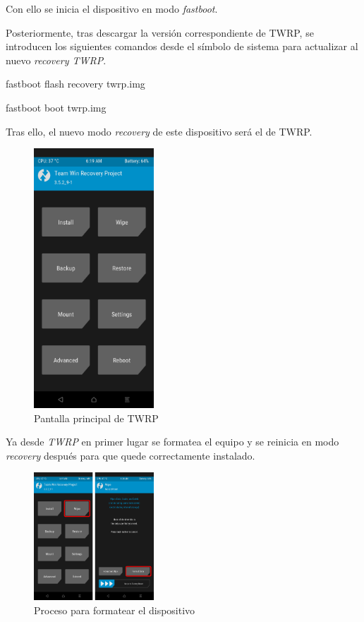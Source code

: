 \documentclass[12pt,a4paper,onecolumn,oneside]{report}
\begin{document}
Con ello se inicia el dispositivo en modo \textit{fastboot}.

Posteriormente, tras descargar la versión correspondiente de TWRP, se introducen los siguientes comandos desde el símbolo de sistema para actualizar al nuevo \textit{recovery TWRP}.

fastboot flash recovery twrp.img

fastboot boot twrp.img

Tras ello, el nuevo modo \textit{recovery} de este dispositivo será el de TWRP.

\begin{figure}[H] 
\centering
  \includegraphics[width=0.4\textwidth]{figuras/root51.png}
  \caption[Pantalla principal de TWRP]{Pantalla principal de TWRP\\
  }
  \label{fig:root51}
\end{figure}


Ya desde \textit{TWRP} en primer lugar se formatea el equipo y se reinicia en modo \textit{recovery} después para que quede correctamente instalado.

\begin{figure}[H] 
\centering
  \includegraphics[width=0.4\textwidth]{figuras/root52.png}
  \caption[Proceso para formatear el dispositivo]{Proceso para formatear el dispositivo\\
  }
  \label{fig:root52}
\end{figure}
\end{document}
